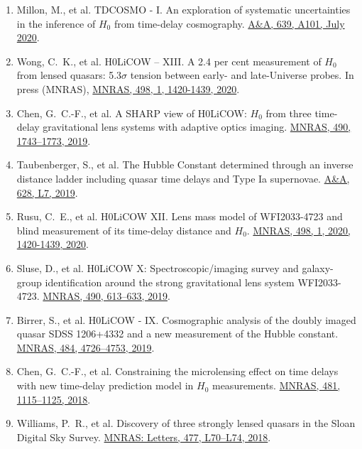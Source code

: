 \documentclass[margin, line]{res}
\begin{document}
\begin{resume}
\begin{enumerate}
	\item Millon, M., et al. TDCOSMO - I. An exploration of systematic uncertainties in the inference of $H_0$ from time-delay cosmography. \href{https://doi.org/10.1051/0004-6361/201937351}{A\&A, 639, A101, July 2020}.
	\item Wong, C.~K., et al. H0LiCOW – XIII. A 2.4 per cent measurement of $H_0$ from lensed quasars: 5.3$\sigma$ tension between early- and late-Universe probes. In press (MNRAS), \href{https://doi.org/10.1093/mnras/stz3094}{MNRAS, 498, 1, 1420-1439, 2020}.
	\item Chen, G.~C.-F., et al. A SHARP view of H0LiCOW: $H_0$ from three time-delay gravitational lens systems with adaptive optics imaging. \href{https://academic.oup.com/mnras/article/doi/10.1093/mnras/stz2547/5568378/}{MNRAS, 490, 1743--1773, 2019}.
	\item Taubenberger, S., et al. The Hubble Constant determined through an inverse distance ladder including quasar time delays and Type Ia supernovae. \href{https://www.aanda.org/articles/aa/abs/2019/08/aa35980-19/aa35980-19.html}{A\&A, 628, L7, 2019}.
	\item Rusu, C.~E., et al. H0LiCOW XII. Lens mass model of WFI2033-4723 and blind measurement of its time-delay distance and $H_0$. \href{http://adsabs.harvard.edu/abs/2019arXiv190509338R}{MNRAS, 498, 1, 2020, 1420-1439, 2020}.
	\item Sluse, D., et al. H0LiCOW X: Spectroscopic/imaging survey and galaxy-group identification around the strong gravitational lens system WFI2033-4723. \href{https://academic.oup.com/mnras/article/doi/10.1093/mnras/stz2483/5561514/}{MNRAS, 490, 613--633, 2019}.
	\item Birrer, S., et al. H0LiCOW - IX. Cosmographic analysis of the doubly imaged quasar SDSS 1206+4332 and a new measurement of the Hubble constant. \href{https://doi.org/10.1093/mnras/stz200}{MNRAS, 484, 4726--4753, 2019}.
	\item Chen, G.~C.-F., et al. Constraining the microlensing effect on time delays with new time-delay prediction model in $H_0$ measurements. \href{https://doi.org/10.1093/mnras/sty2350}{MNRAS, 481, 1115--1125, 2018}.
 	\item Williams, P.~R., et al. Discovery of three strongly lensed quasars in the Sloan Digital Sky Survey. \href{https://doi.org/10.1093/mnrasl/sly043}{MNRAS: Letters, 477, L70--L74, 2018}.
\end{enumerate}


\end{resume}
\end{document}
